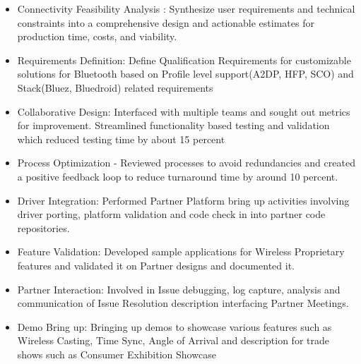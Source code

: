 \documentclass[10pt,a4paper,ragged2e,withhyper]{altacv}
\begin{document}
\begin{paracol}{2}


\begin{itemize}
\item Connectivity Feasibility Analysis : Synthesize user requirements and technical constraints into a comprehensive design and actionable estimates for production time, costs, and viability.
\item Requirements Definition: Define Qualification Requirements for customizable solutions for Bluetooth based on Profile level support(A2DP, HFP, SCO) and Stack(Bluez, Bluedroid) related requirements
\end{itemize}

\divider

\begin{itemize}
\item Collaborative Design: Interfaced with multiple teams and sought out metrics for improvement. Streamlined functionality based testing and validation  which reduced testing time by about 15 percent
\item Process Optimization - Reviewed processes to avoid redundancies and created a positive feedback loop to reduce turnaround time by around 10 percent.
\end{itemize}

\divider

\begin{itemize}
\item Driver Integration: Performed Partner Platform bring up activities involving driver porting, platform validation and code check in into partner code repositories. 
\item  Feature Validation: Developed sample applications for Wireless Proprietary features and validated it on Partner designs and documented it.
\end{itemize}

\divider

\begin{itemize}
\item Partner Interaction: Involved in Issue debugging, log capture, analysis and communication of Issue Resolution description interfacing Partner Meetings. 
\item Demo Bring up: Bringing up demos to showcase various features such as Wireless Casting, Time Sync, Angle of Arrival and description for trade shows such as Consumer Exhibition Showcase
\end{itemize}


\end{paracol}
\end{document}
